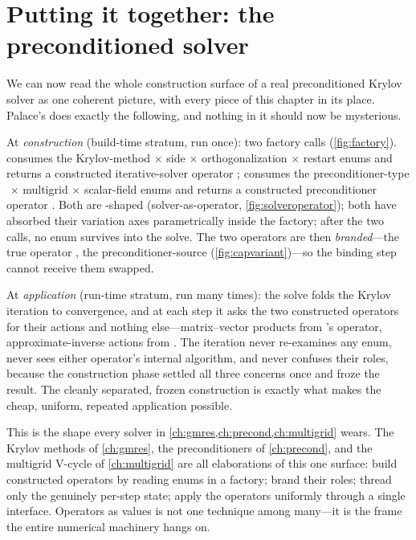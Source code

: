 \section{Putting it together: the preconditioned solver}

We can now read the whole construction surface of a real preconditioned Krylov solver
as one coherent picture, with every piece of this chapter in its place. Palace's
 does exactly the following, and nothing in it should now be
mysterious.

At \emph{construction} (build-time stratum, run once): two factory calls
(\cref{fig:factory}).  consumes the
Krylov-method$\,\times\,$side$\,\times\,$orthogonalization$\,\times\,$restart enums and
returns a constructed iterative-solver operator ; 
consumes the preconditioner-type$\,\times\,$multigrid$\,\times\,$scalar-field enums and
returns a constructed preconditioner operator . Both are -shaped
(solver-as-operator, \cref{fig:solveroperator}); both have absorbed their variation
axes parametrically inside the factory; after the two calls, no enum survives into the
solve. The two operators are then \emph{branded}---the true operator ,
the preconditioner-source  (\cref{fig:capvariant})---so the
binding step  cannot receive them
swapped.

At \emph{application} (run-time stratum, run many times): the solve folds the Krylov
iteration to convergence, and at each step it asks the two constructed operators for
their  actions and nothing else---matrix--vector products from 's
operator, approximate-inverse actions from . The iteration never re-examines
any enum, never sees either operator's internal algorithm, and never confuses their
roles, because the construction phase settled all three concerns once and froze the
result. The cleanly separated, frozen construction is exactly what makes the cheap,
uniform, repeated application possible.

This is the shape every solver in \cref{ch:gmres,ch:precond,ch:multigrid} wears. The Krylov methods of
\cref{ch:gmres}, the preconditioners of \cref{ch:precond}, and the multigrid V-cycle
of \cref{ch:multigrid} are all elaborations of this one surface: build constructed
operators by reading enums in a factory; brand their roles; thread only the genuinely
per-step state; apply the operators uniformly through a single 
interface. Operators as values is not one technique among many---it is the frame the
entire numerical machinery hangs on.

